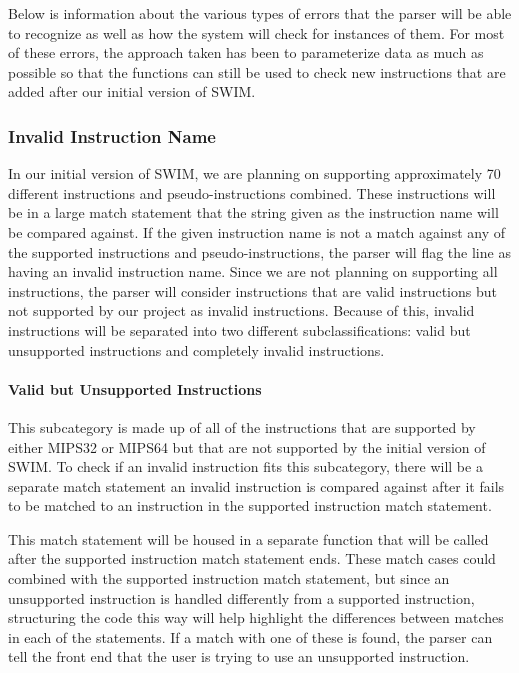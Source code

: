 \documentclass[
    parskip=half,
    fontsize=12pt,
    titlepage=firstiscover,
    toc=bibliography,
    numbers=endperiod
]{scrartcl}
\begin{document}
Below is information about the various types of errors that the parser
will be able to recognize as well as how the system will check for
instances of them. For most of these errors, the approach taken has been
to parameterize data as much as possible so that the functions can still
be used to check new instructions that are added after our initial
version of SWIM.

\subsubsection{Invalid Instruction Name}

In our initial version of SWIM, we are planning on supporting
approximately 70 different instructions and pseudo-instructions
combined. These instructions will be in a large match statement that the
string given as the instruction name will be compared against. If the
given instruction name is not a match against any of the supported
instructions and pseudo-instructions, the parser will flag the line as
having an invalid instruction name. Since we are not planning on
supporting all instructions, the parser will consider instructions that
are valid instructions but not supported by our project as invalid
instructions. Because of this, invalid instructions will be separated
into two different subclassifications: valid but unsupported
instructions and completely invalid instructions.

\paragraph{Valid but Unsupported Instructions}

This subcategory is made up of all of the instructions that are
supported by either MIPS32 or MIPS64 but that are not supported by the
initial version of SWIM. To check if an invalid instruction fits this
subcategory, there will be a separate match statement an invalid
instruction is compared against after it fails to be matched to an
instruction in the supported instruction match statement.

This match statement will be housed in a separate function that will be
called after the supported instruction match statement ends. These match
cases could combined with the supported instruction match statement, but
since an unsupported instruction is handled differently from a supported
instruction, structuring the code this way will help highlight the
differences between matches in each of the statements. If a match with
one of these is found, the parser can tell the front end that the user
is trying to use an unsupported instruction.
\end{document}
